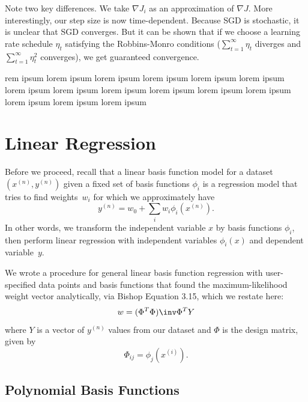 \documentclass{amsart}
\begin{document}
Note two key differences. We take $\nabla J_i$ as an approximation of $\nabla J$. More interestingly, our step size is now time-dependent. Because SGD is stochastic, it is unclear that SGD converges. But it can be shown that if we choose a learning rate schedule $\eta_t$ satisfying the Robbins-Monro conditions ($\sum_{t=1}^\infty \eta_t$ diverges and $\sum_{t=1}^\infty \eta_t^2$ converges), we get guaranteed convergence.


rem ipsum lorem ipsum lorem ipsum lorem ipsum lorem ipsum lorem ipsum lorem ipsum lorem ipsum lorem ipsum lorem ipsum lorem ipsum lorem ipsum lorem ipsum lorem ipsum lorem ipsum 




\section{Linear Regression}

Before we proceed, recall that a linear basis function model for a dataset $(x^{(n)},y^{(n)})$ given a fixed set of basis functions $\phi_i$ is a regression model that tries to find weights~$w_i$ for which we approximately have
\[ y^{(n)} = w_0 + \sum_i w_i \phi_i(x^{(n)}). \]
In other words, we transform the independent variable $x$ by basis functions $\phi_i$, then perform linear regression with independent variables $\phi_i(x)$ and dependent variable~$y$.

We wrote a procedure for general linear basis function regression with user-specified data points and basis functions that found the maximum-likelihood weight vector analytically, via Bishop Equation 3.15, which we restate here:
\begin{equation}
\label{eq:max-likelihood-weights}
w = (\Phi^T\Phi)\inv\Phi^T Y
\end{equation}
where $Y$ is a vector of $y^{(n)}$ values from our dataset and $\Phi$ is the design matrix, given by
\begin{equation}
\Phi_{ij} = \phi_j(x^{(i)}).
\end{equation}

\subsection{Polynomial Basis Functions}
\end{document}
